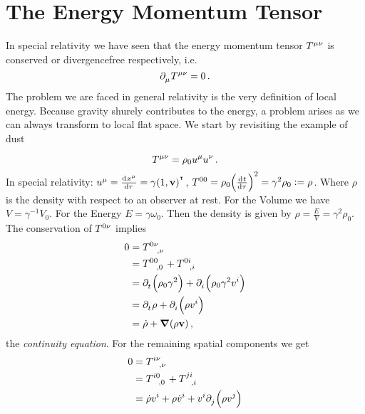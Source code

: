 \chapter{The Energy Momentum Tensor}
In special relativity we have seen that the energy momentum tensor
$\tensor{T}{^\mu^\nu}$ is conserved or divergencefree respectively, i.e.
\begin{equation}
\tensor{\partial}{_\mu}\tensor{T}{^\mu^\nu}=0\,.\label{eq:EMcons}
\end{equation}
The problem we are faced in general relativity is the very definition of local
energy. Because gravity shurely contributes to the energy, a problem arises
as we can always transform to local flat space.
We start by revisiting the example of dust
\begin{example}[Dust]
\begin{equation}
\tensor{T}{^\mu^\nu}=\rho_0\tensor{u}{^\mu}\tensor{u}{^\nu}\,.
\end{equation}
In special relativity:
${\tensor{u}{^\mu}=\od{\tensor{x}{^\mu}}{\tau}=\gamma(1,\vec{v})\transpose}$,
${\tensor{T}{^0^0}=\rho_0\left(\od{t}{\tau}\right)^2}=\gamma^2\rho_0:=\rho$.
Where $\rho$ is the density with respect to an observer at rest. For the Volume
we have $V=\gamma^{-1}V_0$. For the Energy $E=\gamma\omega_0$. Then the density
is given by $\rho=\frac{E}{V}=\gamma^2\rho_0$. The conservation of
$\tensor{T}{^0^\nu}$ implies
\begin{equation}
\begin{split}
0&=\tensor{T}{^0^\nu_{,\nu}}\\
&=\tensor{T}{^0^0_{,0}}+\tensor{T}{^0^i_{,i}}\\
&=\tensor{\partial}{_t}\left(\rho_0\gamma^2\right)
+\tensor{\partial}{_i}\left(\rho_0\gamma^2\tensor{v}{^i}\right)\\
&=\tensor{\partial}{_t}\rho
+\tensor{\partial}{_i}\left(\rho \tensor{v}{^i}\right)\\
&=\dot{\rho}
+\boldsymbol{\nabla}\left(\rho \vec{v}\right)\,,
\end{split}
\end{equation}
the \emph{continuity equation}. For the remaining spatial components we get
\begin{equation}
\begin{split}
0&=\tensor{T}{^i^\nu_{,\nu}}\\
&=\tensor{T}{^i^0_{,0}}+\tensor{T}{^j^i_{,i}}\\
&=\dot{\rho}\tensor{v}{^i}
+\rho\tensor{\dot{v}}{^i}
+\tensor{v}{^i}\tensor{\partial}{_j}\left(\rho\tensor{v}{^j}\right)

\end{split}
\end{equation}
\end{example}

